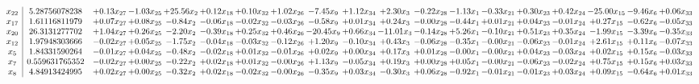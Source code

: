 \documentclass[9pt]{article}
\begin{document}
 \[\begin{array}{c| c c@{\hskip 2pt} c@{\hskip 2pt} c@{\hskip 2pt} c@{\hskip 2pt} c@{\hskip 2pt} c@{\hskip 2pt} c@{\hskip 2pt} c@{\hskip 2pt} c@{\hskip 2pt} c@{\hskip 2pt} c@{\hskip 2pt} c@{\hskip 2pt} c@{\hskip 2pt} c@{\hskip 2pt} c@{\hskip 2pt} c@{\hskip 2pt} c@{\hskip 2pt} }
 x_{22}   &  5.28756078238 & +  0.13 x_{27} & -1.03 x_{25} & + 25.56 x_{2} & +  0.12 x_{18} & +  0.10 x_{32} & +  1.02 x_{26} & -7.45 x_{9} & +  1.12 x_{34} & +  2.30 x_{3} & -0.22 x_{28} & -1.13 x_{1} & -0.33 x_{21} & +  0.30 x_{23} & +  0.42 x_{24} & -25.00 x_{15} & -9.46 x_{6} & +  0.06 x_{33}\\
 x_{17}   &  1.61116811979 & +  0.07 x_{27} & +  0.08 x_{25} & -0.84 x_{2} & -0.06 x_{18} & -0.02 x_{32} & -0.03 x_{26} & -0.58 x_{9} & +  0.01 x_{34} & +  0.24 x_{3} & -0.00 x_{28} & -0.44 x_{1} & +  0.01 x_{21} & +  0.04 x_{23} & -0.01 x_{24} & +  0.27 x_{15} & -0.62 x_{6} & -0.05 x_{33}\\
 x_{20}   &  26.3131277702 & +  1.04 x_{27} & +  0.26 x_{25} & -2.20 x_{2} & -0.39 x_{18} & +  0.25 x_{32} & +  0.46 x_{26} & -20.45 x_{9} & +  0.66 x_{34} & -11.01 x_{3} & -0.14 x_{28} & +  5.26 x_{1} & -0.10 x_{21} & +  0.51 x_{23} & +  0.35 x_{24} & -1.99 x_{15} & -3.39 x_{6} & -0.35 x_{33}\\
 x_{12}   &  1.97948303666 & -0.02 x_{27} & +  0.05 x_{25} & -1.75 x_{2} & -0.04 x_{18} & -0.03 x_{32} & -0.12 x_{26} & +  1.20 x_{9} & -0.10 x_{34} & +  0.43 x_{3} & -0.06 x_{28} & -0.35 x_{1} & -0.00 x_{21} & -0.06 x_{23} & -0.01 x_{24} & +  2.61 x_{15} & +  0.11 x_{6} & -0.07 x_{33}\\
 x_{5}   &  1.84331590264 & -0.01 x_{27} & +  0.04 x_{25} & -0.48 x_{2} & -0.02 x_{18} & +  0.01 x_{32} & -0.01 x_{26} & +  0.02 x_{9} & +  0.00 x_{34} & +  0.17 x_{3} & +  0.01 x_{28} & -0.00 x_{1} & -0.00 x_{21} & +  0.04 x_{23} & -0.03 x_{24} & +  0.02 x_{15} & +  0.15 x_{6} & -0.03 x_{33}\\
 x_{7}   &  0.559631765352 & -0.02 x_{27} & +  0.00 x_{25} & -0.22 x_{2} & +  0.02 x_{18} & +  0.01 x_{32} & -0.00 x_{26} & +  1.13 x_{9} & -0.05 x_{34} & +  0.19 x_{3} & +  0.00 x_{28} & +  0.05 x_{1} & -0.00 x_{21} & -0.06 x_{23} & -0.02 x_{24} & +  0.75 x_{15} & +  0.15 x_{6} & +  0.03 x_{33}\\
 x_{8}   &  4.84913424995 & +  0.02 x_{27} & +  0.00 x_{25} & -0.32 x_{2} & +  0.02 x_{18} & -0.02 x_{32} & -0.00 x_{26} & -0.35 x_{9} & +  0.03 x_{34} & -0.30 x_{3} & +  0.06 x_{28} & -0.92 x_{1} & -0.01 x_{21} & -0.01 x_{23} & +  0.03 x_{24} & +  0.09 x_{15} & -0.64 x_{6} & +  0.01 x_{33}\\

\end{array}\]
\end{document}
